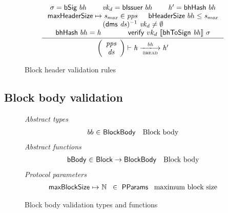 \documentclass[11pt,a4paper]{article}
\newcommand{\var}[1]{\mathit{#1}}
\newcommand{\fun}[1]{\mathsf{#1}}
\newcommand{\type}[1]{\mathsf{#1}}
\newcommand{\trans}[2]{\xlongrightarrow[\textsc{#1}]{#2}}
\newcommand{\serialised}[1]{\llbracket \var{#1} \rrbracket}
\newcommand{\totalf}{\to}
\newcommand{\partialf}{\mapsto}
\newcommand{\Block}{\type{Block}}
\newcommand{\ProtParams}{\type{PParams}} %
\newcommand{\bhdrsizename}{bHeaderSize}
\newcommand{\verifyname}{verify}
\newcommand{\bsigname}{bSig}
\newcommand{\bissuername}{bIssuer}
\newcommand{\verify}[3]{\fun{\verifyname} ~ #1 ~ #2 ~ #3}
\newcommand{\bhdrsize}[1]{\fun{\bhdrsizename} ~ #1}
\newcommand{\bsig}[1]{\fun{\bsigname} ~ #1}
\newcommand{\bissuer}[1]{\fun{\bissuername} ~ #1}
\begin{document}
\begin{figure}[ht]
  \begin{equation*}
    \inference
    { \sigma = \bsig{bh} & \var{vk_d} = \bissuer{bh} & \var{h'} = \bhhash{bh}
    \\ \maxheadersize \mapsto \var{s_{max}} \in \var{pps} & \bhdrsize{bh} \leq \var{s_{max}}
    \\  (\fun{dms} ~ \var{ds})^{-1} ~ \var{vk_d} \neq \emptyset
    \\ \bhprevhash{bh} = \var{h} & \verify{vk_d}{\serialised{\bhtosign{bh}}}{\sigma}
    }
    {
      \left(
        {\begin{array}{c}
          \var{pps} \\
          \var{ds} \\
        \end{array}}
      \right)
      \vdash
        {\var{h}}
      \trans{bhead}{\var{bh}}
        {\var{h'}}
    }
  \end{equation*}
  \caption{Block header validation rules}
  \label{fig:rules:bhead}
\end{figure}

\clearpage

\subsection{Block body validation}
\begin{figure}[ht]
  \emph{Abstract types}
  \begin{equation*}
    \begin{array}{r@{~\in~}lr}
    bb & \Bbody & \text{Block body}
    \end{array}
  \end{equation*}
  \emph{Abstract functions}
  \begin{equation*}
    \begin{array}{r@{~\in~}lr}
    \fun{\bbodyname} & \Block \totalf \Bbody & \text{Block body} \\
    \end{array}
  \end{equation*}
  \emph{Protocol parameters}
  \begin{equation*}
    \begin{array}{r@{~\partialf~}l!{~\in~\ProtParams~}r}
    \maxblocksize & \mathbb{N} & \text{maximum block size} \\
    \end{array}
  \end{equation*}
  \caption{Block body validation types and functions}
  \label{fig:defs:bbody}
\end{figure}
\end{document}
